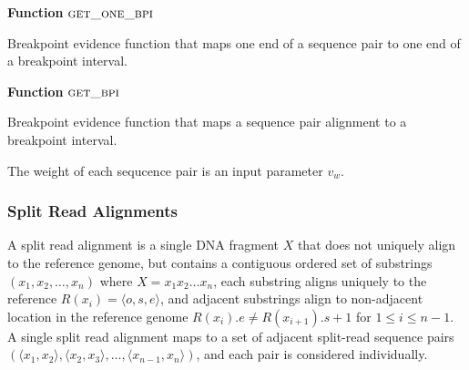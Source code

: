 \documentclass[11pt]{article}
\begin{document}
\begin{algorithm}[H]
    \DontPrintSemicolon
    \footnotesize
    \BlankLine
    \textbf{Function} $\textsc{get\_one\_bpi}$\;
	\caption{Breakpoint evidence function that maps one end of a sequence pair
			to one end of a breakpoint interval.}
    \label{get_one_bpi}
\end{algorithm}

\begin{algorithm}[H]
    \DontPrintSemicolon
    \footnotesize
    \BlankLine
    \textbf{Function} $\textsc{get\_bpi}$\;
	\caption{Breakpoint evidence function that maps a sequence pair alignment to
			a breakpoint interval.}
    \label{get_bp}
\end{algorithm}


The weight of each sequcence pair is an input parameter $v_w$.  

\subsubsection{Split Read Alignments}

A split read alignment is a single DNA fragment $X$ that does not uniquely align
to the reference genome, but contains a contiguous ordered set of substrings
$(x_1, x_2, \dots, x_n)$ where $X=x_1x_2\dots x_n$, each substring aligns
uniquely to the reference $R(x_i)=\langle o,s,e \rangle$, and adjacent
substrings align to non-adjacent location in the reference genome
$R(x_{i}).e \neq R(x_{i+1}).s + 1$ for $1\leq i \leq n-1$. A single split read
alignment maps to a set of adjacent split-read sequence pairs 
$(\langle x_1 , x_2 \rangle, \langle x_2, x_3 \rangle, \dots ,
\langle x_{n-1},x_n \rangle)$, and each pair is considered individually.
\end{document}
